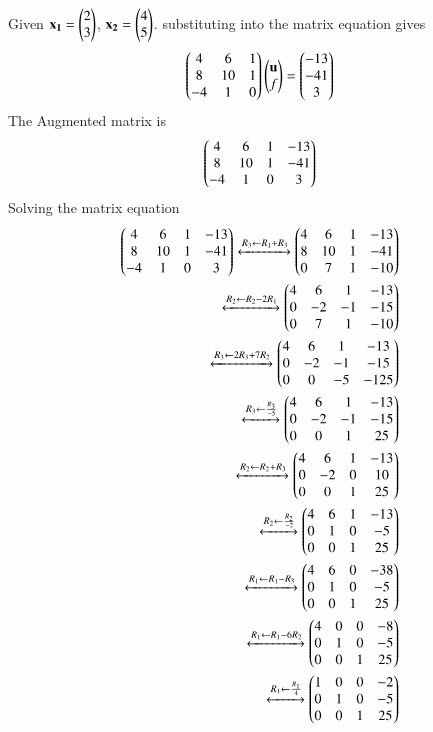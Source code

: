 \documentclass[journal]{IEEEtran}
\begin{document}
Given $\mathbf{x_1}=\begin{pmatrix}2\\3\end{pmatrix}$, $\mathbf{x_2}=\begin{pmatrix}4\\5\end{pmatrix}$. substituting into the matrix equation gives
\begin{align}
\begin{pmatrix}4 & 6 & 1\\8 & 10 & 1\\-4 & 1 & 0\end{pmatrix}\begin{pmatrix}\mathbf{u}\\f\end{pmatrix}=\begin{pmatrix}-13\\-41\\3\end{pmatrix}
\end{align}
The Augmented matrix is 
\begin{align}
\begin{pmatrix}4 & 6 & 1 & -13\\8 & 10 & 1 & -41\\-4 & 1 & 0 & 3\end{pmatrix}
\end{align}
Solving the matrix equation
\begin{align}
\begin{pmatrix}4 & 6 & 1 & -13\\8 & 10 & 1 & -41\\-4 & 1 & 0 & 3\end{pmatrix}\xleftrightarrow[]{R_3 \leftarrow R_1+R_3}\begin{pmatrix}4 & 6 & 1 & -13\\8 & 10 & 1 & -41\\0 & 7 & 1 & -10\end{pmatrix}\\
\xleftrightarrow[]{R_2 \leftarrow R_2-2R_1}\begin{pmatrix}4 & 6 & 1 & -13\\0 & -2 & -1 & -15\\0 & 7 & 1 & -10\end{pmatrix}\\
\xleftrightarrow[]{R_3 \leftarrow 2R_3+7R_2}\begin{pmatrix}4 & 6 & 1 & -13\\0 & -2 & -1 & -15\\0 & 0 & -5 & -125\end{pmatrix}\\
\xleftrightarrow[]{R_3 \leftarrow \frac{R_3}{-5}}\begin{pmatrix}4 & 6 & 1 & -13\\0 & -2 & -1 & -15\\0 & 0 & 1 & 25\end{pmatrix}\\
\xleftrightarrow[]{R_2 \leftarrow R_2+R_3}\begin{pmatrix}4 & 6 & 1 & -13\\0 & -2 & 0 & 10\\0 & 0 & 1 & 25\end{pmatrix}\\
\xleftrightarrow[]{R_2 \leftarrow \frac{R_2}{-2}}\begin{pmatrix}4 & 6 & 1 & -13\\0 & 1 & 0 & -5	\\0 & 0 & 1 & 25\end{pmatrix}\\
\xleftrightarrow[]{R_1 \leftarrow R_1-R_3}\begin{pmatrix}4 & 6 & 0 & -38\\0 & 1 & 0 & -5\\0 & 0 & 1 & 25\end{pmatrix}\\
\xleftrightarrow[]{R_1 \leftarrow R_1-6R_2}\begin{pmatrix}4 & 0 & 0 & -8\\0 & 1 & 0 & -5\\0 & 0 & 1 & 25\end{pmatrix}\\
\xleftrightarrow[]{R_1 \leftarrow \frac{R_1}{4}}\begin{pmatrix}1 & 0 & 0 & -2\\0 & 1 & 0 & -5\\0 & 0 & 1 & 25\end{pmatrix}
\end{align}
\end{document}
